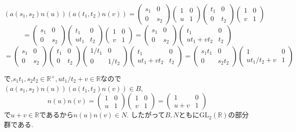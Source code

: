 \[(a(s_1,s_2)n(u))(a(t_1,t_2)n(v))=
\begin{pmatrix}s_1&0\\0&s_2\end{pmatrix}
\begin{pmatrix}1&0\\u&1\end{pmatrix}
\begin{pmatrix}t_1&0\\0&t_2\end{pmatrix}
\begin{pmatrix}1&0\\v&1\end{pmatrix}
\]
\[
=\begin{pmatrix}s_1&0\\0&s_2\end{pmatrix}
\begin{pmatrix}t_1&0\\ut_1&t_2\end{pmatrix}
\begin{pmatrix}1&0\\v&1\end{pmatrix}
=\begin{pmatrix}s_1&0\\0&s_2\end{pmatrix}
\begin{pmatrix}t_1&0\\ut_1+vt_2&t_2\end{pmatrix}
\]
\[
=\begin{pmatrix}s_1&0\\0&s_2\end{pmatrix}
\begin{pmatrix}t_1&0\\0&t_2\end{pmatrix}
\begin{pmatrix}1/t_1&0\\0&1/t_2\end{pmatrix}
\begin{pmatrix}	t_1&0\\ut_1+vt_2&t_2\end{pmatrix}
=\begin{pmatrix}s_1t_1&0\\0&s_2t_2\end{pmatrix}
\begin{pmatrix}1&0\\ut_1/t_2+v&1\end{pmatrix}
\]

で,$s_1t_1,s_2t_2 \in \mathbb{R}^\times, ut_1/t_2+v \in \mathbb{R}$なので
$(a(s_1,s_2)n(u))(a(t_1,t_2)n(v)) \in B$,
\[
n(u)n(v)=
\begin{pmatrix}
	1&0\\u&1
\end{pmatrix}
\begin{pmatrix}
	1&0\\v&1
\end{pmatrix}
=\begin{pmatrix}
	1&0\\u+v&1
\end{pmatrix}
\]
で$u+v\in \mathbb{R}$であるから$n(u)n(v)\in N$.
したがって$B,N$ともに$\mathrm{GL}_2(\mathbb{R})$の部分群である.

